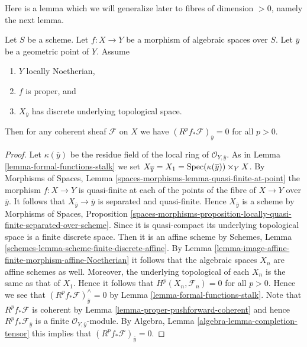 \noindent
Here is a lemma which we will generalize later to fibres of
dimension $ > 0$, namely the next lemma.

\begin{lemma}
\label{lemma-higher-direct-images-zero-finite-fibre}
Let $S$ be a scheme. Let $f : X \to Y$ be a morphism of algebraic spaces
over $S$. Let $\overline{y}$ be a geometric point of $Y$.
Assume
\begin{enumerate}
\item $Y$ locally Noetherian,
\item $f$ is proper, and
\item $X_{\overline{y}}$ has discrete underlying topological space.
\end{enumerate}
Then for any coherent sheaf $\mathcal{F}$ on $X$ we have
$(R^pf_*\mathcal{F})_{\overline{y}} = 0$ for all $p > 0$.
\end{lemma}

\begin{proof}
Let $\kappa(\overline{y})$ be the residue field of the local
ring of $\mathcal{O}_{Y, \overline{y}}$. As in
Lemma \ref{lemma-formal-functions-stalk}
we set $X_{\overline{y}} = X_1 = \mathop{\mathrm{Spec}}(\kappa(\overline{y})) \times_Y X$.
By Morphisms of Spaces, Lemma
\ref{spaces-morphisms-lemma-quasi-finite-at-point}
the morphism $f : X \to Y$ is quasi-finite at each of
the points of the fibre of $X \to Y$ over $\overline{y}$.
It follows that $X_{\overline{y}} \to \overline{y}$ is separated and
quasi-finite. Hence $X_{\overline{y}}$ is a scheme
by Morphisms of Spaces, Proposition
\ref{spaces-morphisms-proposition-locally-quasi-finite-separated-over-scheme}.
Since it is quasi-compact its underlying topological space is a finite
discrete space. Then it is an affine scheme by
Schemes, Lemma \ref{schemes-lemma-scheme-finite-discrete-affine}.
By Lemma \ref{lemma-image-affine-finite-morphism-affine-Noetherian}
it follows that the algebraic spaces $X_n$ are affine schemes as well.
Moreover, the underlying topological of each $X_n$ is the same
as that of $X_1$. Hence it follows that $H^p(X_n, \mathcal{F}_n) = 0$
for all $p > 0$. Hence we see that
$(R^pf_*\mathcal{F})_{\overline{y}}^\wedge = 0$
by Lemma \ref{lemma-formal-functions-stalk}.
Note that $R^pf_*\mathcal{F}$ is coherent by
Lemma \ref{lemma-proper-pushforward-coherent} and
hence $R^pf_*\mathcal{F}_{\overline{y}}$ is a finite
$\mathcal{O}_{Y, \overline{y}}$-module.
By Algebra, Lemma \ref{algebra-lemma-completion-tensor}
this implies that $(R^pf_*\mathcal{F})_{\overline{y}} = 0$.
\end{proof}

